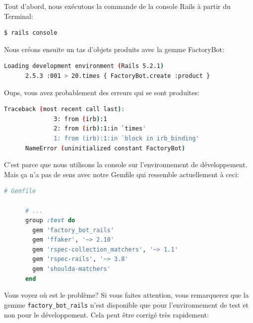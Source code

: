 \documentclass[]{report}
\begin{document}
    Tout d'abord, nous exécutons la commande de la console Rails à partir du Terminal:

    \begin{scriptsize}
      \begin{lstlisting}[language=bash]
      $ rails console
      \end{lstlisting}
    \end{scriptsize}

    Nous créons ensuite un tas d'objets produits avec la gemme FactoryBot:

    \begin{scriptsize}
      \begin{lstlisting}[language=bash]
      Loading development environment (Rails 5.2.1)
      2.5.3 :001 > 20.times { FactoryBot.create :product }
      \end{lstlisting}
    \end{scriptsize}

    Oups, vous avez probablement des erreurs qui se sont produites:

    \begin{scriptsize}
      \begin{lstlisting}[language=bash]
      Traceback (most recent call last):
              3: from (irb):1
              2: from (irb):1:in `times'
              1: from (irb):1:in `block in irb_binding'
      NameError (uninitialized constant FactoryBot)
      \end{lstlisting}
    \end{scriptsize}

    C'est parce que nous utilisons la console sur l'environnement de développement. Mais ça n'a pas de sens avec notre Gemfile qui ressemble actuellement à ceci:

    \begin{scriptsize}
      \begin{lstlisting}[language=ruby]
      # Gemfile

      # ...
      group :test do
        gem 'factory_bot_rails'
        gem 'ffaker', '~> 2.10'
        gem 'rspec-collection_matchers', '~> 1.1'
        gem 'rspec-rails', '~> 3.8'
        gem 'shoulda-matchers'
      end
      \end{lstlisting}
    \end{scriptsize}

    Vous voyez où est le problème? Si vous faites attention, vous remarquerez que la gemme \verb|factory_bot_rails| n'est disponible que pour l'environnement de test et non pour le développement. Cela peut être corrigé très rapidement:
\end{document}
